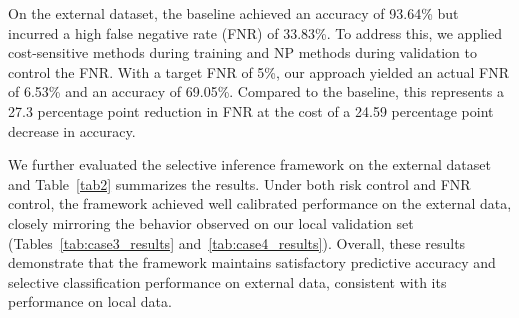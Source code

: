 \documentclass[journal,twoside,web]{ieeecolor}
\begin{document}
On the external dataset, the baseline achieved an accuracy of 93.64\% but incurred a high false negative rate (FNR) of 33.83\%. To address this, we applied cost-sensitive methods during training and NP methods during validation to control the FNR. With a target FNR of 5\%, our approach yielded an actual FNR of 6.53\% and an accuracy of 69.05\%. Compared to the baseline, this represents a 27.3 percentage point reduction in FNR at the cost of a 24.59 percentage point decrease in accuracy. 
\begin{table}[htbp]
    \centering
    \caption{The selective classification performance of external validation.}
    \label{tab2}
    \renewcommand\arraystretch{1.2} 
\end{table}

We further evaluated the selective inference framework on the external dataset and Table~\ref{tab2} summarizes the results. Under both risk control and FNR control, the framework achieved well calibrated performance on the external data, closely mirroring the behavior observed on our local validation set (Tables~\ref{tab:case3_results} and~\ref{tab:case4_results}). Overall, these results demonstrate that the framework maintains satisfactory predictive accuracy and selective classification performance on external data, consistent with its performance on local data.
\end{document}
